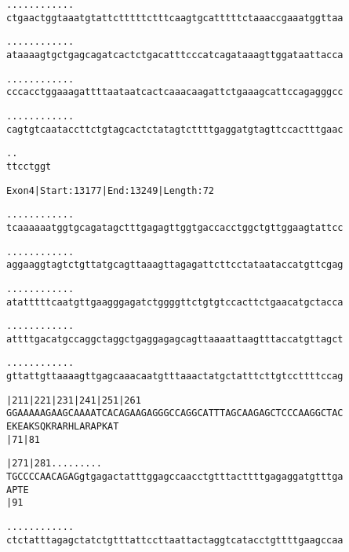 \documentclass{article}
\begin{document}
\begin{alltt}
  .    .    .    .    .    .    .    .    .    .    .    .
ctgaactggtaaatgtattctttttctttcaagtgcatttttctaaaccgaaatggttaa



  .    .    .    .    .    .    .    .    .    .    .    .
ataaaagtgctgagcagatcactctgacatttcccatcagataaagttggataattacca



  .    .    .    .    .    .    .    .    .    .    .    .
cccacctggaaagattttaataatcactcaaacaagattctgaaagcattccagagggcc



  .    .    .    .    .    .    .    .    .    .    .    .
cagtgtcaataccttctgtagcactctatagtcttttgaggatgtagttccactttgaac



  .    .
ttcctggt


\end{alltt}
\newpage
\begin{alltt}
Exon 4 | Start: 13177 | End: 13249 | Length: 72

.    .    .    .    .    .    .    .    .    .    .    .
tcaaaaaatggtgcagatagctttgagagttggtgaccacctggctgttggaagtattcc



.    .    .    .    .    .    .    .    .    .    .    .
aggaaggtagtctgttatgcagttaaagttagagattcttcctataataccatgttcgag



.    .    .    .    .    .    .    .    .    .    .    .
atatttttcaatgttgaagggagatctggggttctgtgtccacttctgaacatgctacca



.    .    .    .    .    .    .    .    .    .    .    .
attttgacatgccaggctaggctgaggagagcagttaaaattaagtttaccatgttagct



.    .    .    .    .    .    .    .    .    .    .    .
gttattgttaaaagttgagcaaacaatgtttaaactatgctatttcttgtccttttccag



 |211      |221      |231      |241      |251      |261
GGAAAAAGAAGCAAAATCACAGAAGAGGGCCAGGCATTTAGCAAGAGCTCCCAAGGCTAC
 E  K  E  A  K  S  Q  K  R  A  R  H  L  A  R  A  P  K  A  T
 |71                           |81

 |271      |281  .    .    .    .    .    .    .    .    .
TGCCCCAACAGAGgtgagactatttggagccaacctgtttacttttgagaggatgtttga
 A  P  T  E
 |91

  .    .    .    .    .    .    .    .    .    .    .    .
ctctatttagagctatctgtttattccttaattactaggtcatacctgttttgaagccaa



\end{alltt}
\end{document}
